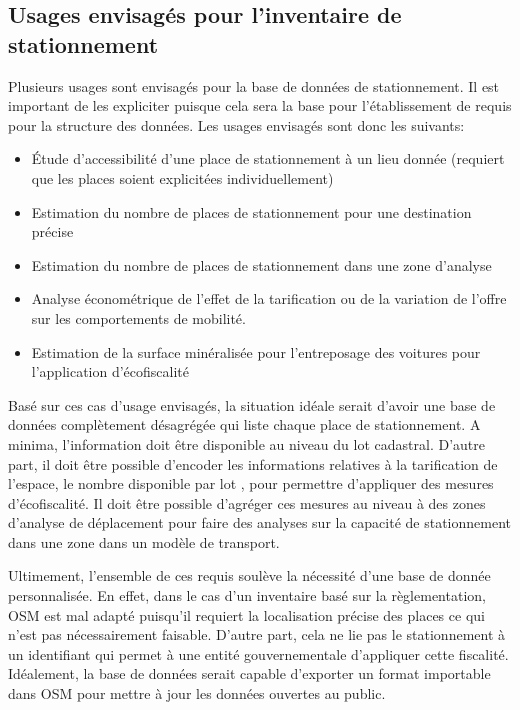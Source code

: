     \subsection{Usages envisagés pour l'inventaire de stationnement}
    Plusieurs usages sont envisagés pour la base de données de stationnement. Il est important de les expliciter puisque cela sera la base pour l'établissement de requis pour la structure des données. Les usages envisagés sont donc les suivants:
    \begin{itemize}
        \item Étude d'accessibilité d'une place de stationnement à un lieu donnée (requiert que les places soient explicitées individuellement)
        \item Estimation du nombre de places de stationnement pour une destination précise
        \item Estimation du nombre de places de stationnement dans une zone d'analyse
        \item Analyse économétrique de l'effet de la tarification ou de la variation de l'offre sur les comportements de mobilité.
        \item Estimation de la surface minéralisée pour l'entreposage des voitures pour l'application d'écofiscalité   
    \end{itemize}
    Basé sur ces cas d'usage envisagés, la situation idéale serait d'avoir une base de données complètement désagrégée qui liste chaque place de stationnement. A minima, l'information doit être disponible au niveau du lot cadastral. D'autre part, il doit être possible d'encoder les informations relatives à la tarification de l'espace, le nombre disponible par lot , pour permettre d'appliquer des mesures d'écofiscalité. Il doit être possible d'agréger ces mesures au niveau à des zones d'analyse de déplacement pour faire des analyses sur la capacité de stationnement dans une zone dans un modèle de transport. \par
    Ultimement, l'ensemble de ces requis soulève la nécessité d'une base de donnée personnalisée. En effet, dans le cas d'un inventaire basé sur la règlementation, \ac{OSM} est mal adapté puisqu'il requiert la localisation précise des places ce qui n'est pas nécessairement faisable. D'autre part, cela ne lie pas le stationnement à un identifiant qui permet à une entité gouvernementale d'appliquer cette fiscalité. Idéalement, la base de données serait capable d'exporter un format importable dans \ac{OSM} pour mettre à jour les données ouvertes au public.
